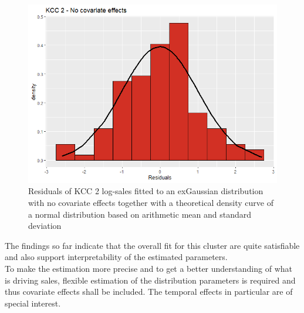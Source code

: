 \begin{figure}[H]
\centering
  \includegraphics[width=0.45\linewidth]{figures/res_kcc_2_no_covariates.png}
  \caption{Residuals of KCC 2 log-sales fitted to an exGaussian distribution with no covariate effects together with a theoretical density curve of a normal distribution based on arithmetic mean and standard deviation}
  \label{fig:res_kcc_2_no_covariates}
\end{figure}

The findings so far indicate that the overall fit for this cluster are quite satisfiable and also support interpretability of the estimated parameters. \\

To make the estimation more precise and to get a better understanding of what is driving sales, flexible estimation of the distribution parameters is required and thus covariate effects shall be included. The temporal effects in particular are of special interest. 


